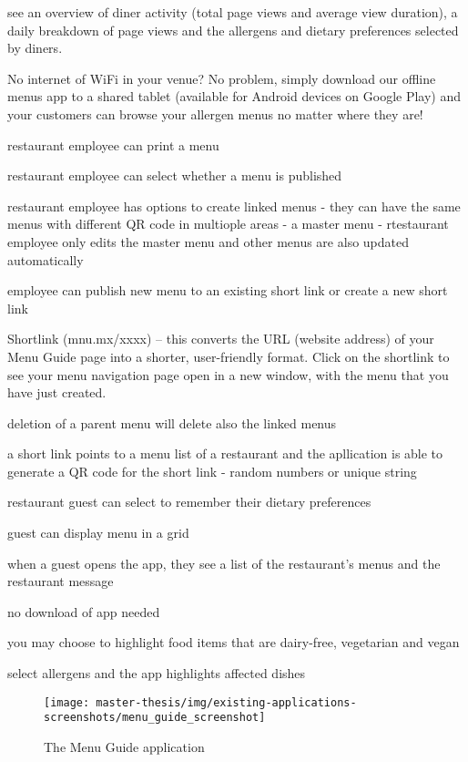   see an overview of diner
  activity (total page views and average view duration), a daily breakdown of page views and the allergens and dietary preferences selected by diners.

  No internet of WiFi in your venue? No problem, simply download our offline menus app to a shared tablet (available for Android devices on Google Play) and your customers can browse your allergen menus no matter where they are!

  restaurant employee can print a menu

  restaurant employee can select whether a menu is published

  restaurant employee has options to create linked menus - they can have the same menus with different QR code in multiople areas - a master menu - rtestaurant employee only edits the master menu and other menus are also updated automatically

  employee can publish new menu to an existing short link or create a new short link 

  Shortlink (mnu.mx/xxxx) – this converts the URL (website address) of your Menu Guide
  page into a shorter, user-friendly format. Click on the shortlink to see your menu navigation page open in a new window, with the menu that you have just created.

  deletion of a parent menu will delete also the linked menus

  a short link points to a menu list of a restaurant and the apllication is able to generate a QR code for the short link - random numbers or unique string








  restaurant guest can select to remember their dietary preferences

  guest can display menu in a grid

  when a guest opens the app, they see a list of the restaurant's menus and the restaurant message

  no download of app needed

  you may choose to highlight food items that are dairy-free, vegetarian and vegan

  select allergens and the app highlights affected dishes

  \begin{figure}[h]
    \centering
    \texttt{[image: master-thesis/img/existing-applications-screenshots/menu\_guide\_screenshot]}
    \caption{The Menu Guide application}
  \end{figure}


